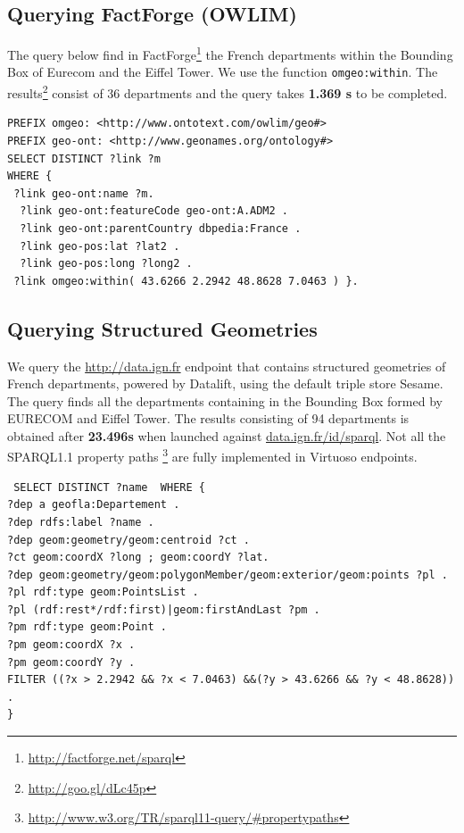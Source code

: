\subsection{Querying FactForge (OWLIM)}
\label{sec:factforge}

The query below find in FactForge\footnote{\url{http://factforge.net/sparql}} the French departments within the Bounding Box of Eurecom and the Eiffel Tower. We use the function \texttt{omgeo:within}. The results\footnote{\url{http://goo.gl/dLc45p}} consist of 36 departments and the query takes \textbf{1.369 s} to be completed.
\begin{verbatim}
PREFIX omgeo: <http://www.ontotext.com/owlim/geo#>
PREFIX geo-ont: <http://www.geonames.org/ontology#>
SELECT DISTINCT ?link ?m
WHERE {
 ?link geo-ont:name ?m.
  ?link geo-ont:featureCode geo-ont:A.ADM2 .
  ?link geo-ont:parentCountry dbpedia:France .
  ?link geo-pos:lat ?lat2 .
  ?link geo-pos:long ?long2 .
 ?link omgeo:within( 43.6266 2.2942 48.8628 7.0463 ) }.

\end{verbatim}


\subsection{Querying Structured Geometries}
\label{sec:ignsparql}
 We query the \url{http://data.ign.fr} endpoint that contains structured geometries of French departments, powered by Datalift, using the default triple store Sesame. The query finds all the departments containing in the Bounding Box formed by EURECOM and Eiffel Tower. The results consisting of 94 departments is obtained after \textbf{23.496s} when launched against \url{data.ign.fr/id/sparql}. Not all the SPARQL1.1 property paths \footnote{\url{http://www.w3.org/TR/sparql11-query/\#propertypaths}} are fully implemented in Virtuoso endpoints.


 \begin{verbatim}
 SELECT DISTINCT ?name  WHERE {
?dep a geofla:Departement .
?dep rdfs:label ?name .
?dep geom:geometry/geom:centroid ?ct .
?ct geom:coordX ?long ; geom:coordY ?lat.
?dep geom:geometry/geom:polygonMember/geom:exterior/geom:points ?pl .
?pl rdf:type geom:PointsList .
?pl (rdf:rest*/rdf:first)|geom:firstAndLast ?pm .
?pm rdf:type geom:Point .
?pm geom:coordX ?x .
?pm geom:coordY ?y .
FILTER ((?x > 2.2942 && ?x < 7.0463) &&(?y > 43.6266 && ?y < 48.8628)) .
}
 \end{verbatim}


